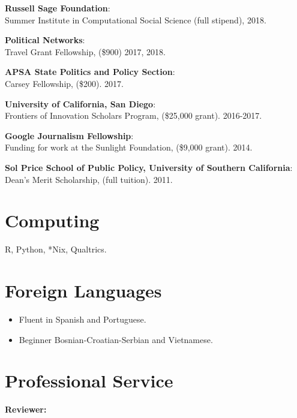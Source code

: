 \documentclass[margin,line]{res}
\newenvironment{list1}{
  \begin{list}{\ding{113}}{%
      \setlength{\itemsep}{0in}
      \setlength{\parsep}{0in} \setlength{\parskip}{0in}
      \setlength{\topsep}{0in} \setlength{\partopsep}{0in} 
      \setlength{\leftmargin}{0.17in}}}{\end{list}}
\begin{document}
\begin{resume}
{\bf Russell Sage Foundation}:\\ Summer Institute in Computational Social Science (full stipend),  2018.

{\bf Political Networks}:\\ Travel Grant Fellowship, (\$900) 2017, 2018.

{\bf APSA State Politics and Policy Section}:\\ Carsey Fellowship, (\$200). 2017. 

{\bf University of California, San Diego}:\\
Frontiers of Innovation Scholars Program, (\$25,000 grant). 2016-2017. 

{\bf Google Journalism Fellowship}:\\
Funding for work at the Sunlight Foundation, (\$9,000 grant). 2014.

{\bf Sol Price School of Public Policy, University of Southern California}:\\ Dean's Merit Scholarship, (full tuition). 2011.


\section{\sc Computing} 
\begin{list1}
\item[] R, Python, *Nix, Qualtrics.
\end{list1}

\section{\sc Foreign Languages} 
\begin{itemize}
\item Fluent in Spanish and Portuguese.
\item Beginner Bosnian-Croatian-Serbian and Vietnamese.
\end{itemize}

\section{\sc Professional Service}
{\bf Reviewer:}


\end{resume}
\end{document}
